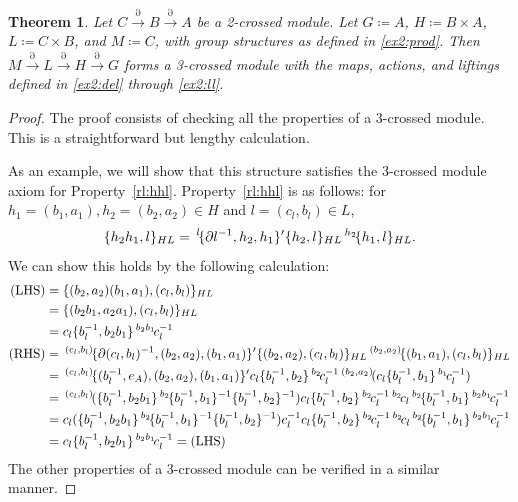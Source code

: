 \documentclass{tac}
\newtheorem{theorem}{Theorem}
\newcommand{\act}[1]{\,\sp{#1}\!}
\begin{document}
\begin{theorem}
Let $C\xrightarrow{\partial}B \xrightarrow{\partial} A$ be a 2-crossed module. Let $G \coloneqq A$, $H \coloneqq B\times A$, $L \coloneqq C\times B$, and $M \coloneqq C$, with group structures as defined in \eqref{ex2:prod}.
Then $M \xrightarrow{\partial} L \xrightarrow{\partial} H \xrightarrow{\partial} G$ forms a 3-crossed module with the maps, actions, and liftings defined in \eqref{ex2:del} through \eqref{ex2:ll}.
\end{theorem}
\begin{proof}
The proof consists of checking all the properties of a 3-crossed module. This is a straightforward but lengthy calculation.

As an example, we will show that this structure satisfies the 3-crossed module axiom for Property~\ref{rl:hhl}. Property~\ref{rl:hhl} is as follows: for $h_1 = (b_1, a_1), h_2 = (b_2, a_2)  \in H$ and $l = (c_l, b_l) \in L$,
\begin{align*}
\{h_2h_1,l\}_{HL} = \act{l}\{\partial l^{-1},h_2,h_1\}'\{h_2,l\}_{HL} \act{h_2}\{h_1,l\}_{HL}  .
\end{align*}
We can show this holds by the following calculation:
\begin{align*}
  \nonumber
  (\text{LHS}) &= \{(b_2,a_2)(b_1,a_1),(c_l,b_l)\}_{HL} \\
  \nonumber
  &= \{(b_2b_1,a_2a_1),(c_l,b_l)\}_{HL} \\
  \nonumber
  &= c_l\{b_l^{-1},b_2b_1\}\act{b_2b_1}c_l^{-1} \\
  \nonumber
  (\text{RHS}) &= \act{(c_l,b_l)}\{\partial (c_l,b_l)^{-1},(b_2,a_2),(b_1,a_1)\}'\{(b_2,a_2),(c_l,b_l)\}_{HL}\act{(b_2,a_2)}\{(b_1,a_1),(c_l,b_l)\}_{HL} \\
  \nonumber
  &= \act{(c_l,b_l)}\{(b_l^{-1},e_A),(b_2,a_2),(b_1,a_1)\}'c_l\{b_l^{-1},b_2\}\act{b_2}c_l^{-1}\act{(b_2,a_2)}(c_l\{b_l^{-1},b_1\}\act{b_1}c_l^{-1}) \\
  \nonumber
  &= \act{(c_l,b_l)}(\{b_l^{-1},b_2b_1\}\act{b_2}\{b_l^{-1},b_1\}^{-1}\{b_l^{-1},b_2\}^{-1})c_l\{b_l^{-1},b_2\}\act{b_2}c_l^{-1}\act{b_2}c_l\act{b_2}\{b_l^{-1},b_1\}\act{b_2b_1}c_l^{-1} \\
  &= c_l(\{b_l^{-1},b_2b_1\}\act{b_2}\{b_l^{-1},b_1\}^{-1}\{b_l^{-1},b_2\}^{-1})c_l^{-1}c_l\{b_l^{-1},b_2\}\act{b_2}c_l^{-1}\act{b_2}c_l\act{b_2}\{b_l^{-1},b_1\}\act{b_2b_1}c_l^{-1} \\
  \nonumber
  &= c_l\{b_l^{-1},b_2b_1\}\act{b_2b_1}c_l^{-1} = (\text{LHS})
\end{align*}
The other properties of a 3-crossed module can be verified in a similar manner.
\end{proof}
\end{document}
